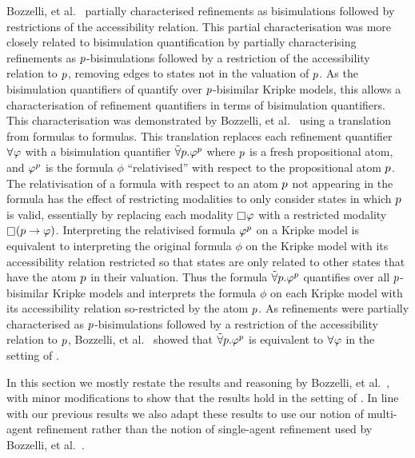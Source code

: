 Bozzelli, et al.~\cite{bozzelli:2014b} partially characterised refinements as bisimulations followed by restrictions of the accessibility relation.
This partial characterisation was more closely related to bisimulation quantification by partially characterising refinements as $p$-bisimulations followed by a restriction of the accessibility relation to $p$, removing edges to states not in the valuation of $p$.
As the bisimulation quantifiers of \logicBqml{} quantify over $p$-bisimilar Kripke models, this allows a characterisation of refinement quantifiers in terms of bisimulation quantifiers.
This characterisation was demonstrated by Bozzelli, et al.~\cite{bozzelli:2014b} using a translation from \langRml{} formulas to \langBqml{} formulas.
This translation replaces each refinement quantifier $\allrefs \phi$ with a bisimulation quantifier ${\tilde\forall {p} . } \varphi^p$ where $p$ is a fresh propositional atom, and $\varphi^p$ is the formula $\phi$ ``relativised'' with respect to the propositional atom $p$.
The relativisation of a formula with respect to an atom $p$ not appearing in the formula has the effect of restricting modalities to only consider states in which $p$ is valid, essentially by replacing each modality $\necessary \phi$ with a restricted modality $\necessary (\atomP \implies \phi)$.
Interpreting the relativised formula $\varphi^p$ on a Kripke model is equivalent to interpreting the original formula $\phi$ on the Kripke model with its accessibility relation restricted so that states are only related to other states that have the atom $p$ in their valuation.
Thus the formula ${\tilde\forall {p} . } \varphi^p$ quantifies over all $p$-bisimilar Kripke models and interprets the formula $\phi$ on each Kripke model with its accessibility relation so-restricted by the atom $p$.
As refinements were partially characterised as $p$-bisimulations followed by a restriction of the accessibility relation to $p$, Bozzelli, et al.~\cite{bozzelli:2014b} showed that ${\tilde\forall {p} . } \varphi^p$ is equivalent to $\allrefs \phi$ in the setting of \classK{}.

In this section we mostly restate the results and reasoning by Bozzelli, et al.~\cite{bozzelli:2014b}, with minor modifications to show that the results hold in the setting of \classKF{}.
In line with our previous results we also adapt these results to use our notion of multi-agent refinement rather than the notion of single-agent refinement used by Bozzelli, et al.~\cite{bozzelli:2014b}.

